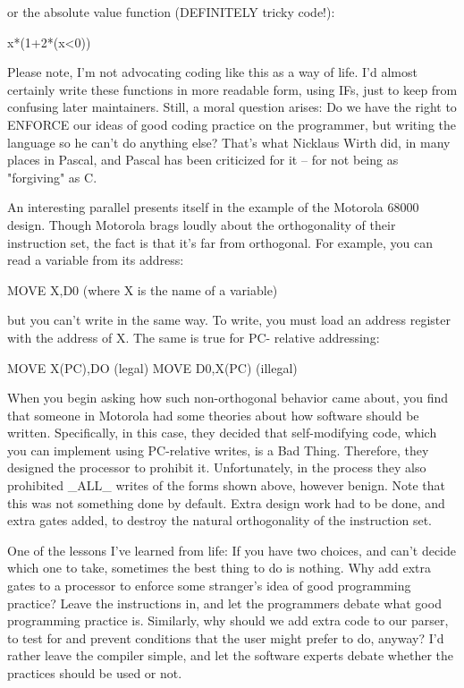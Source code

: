 \documentclass[float=false, crop=false]{standalone}
\begin{document}
or the absolute value function (DEFINITELY tricky code!):

	x*(1+2*(x<0))

Please note, I'm not advocating coding like this as a way of life.
I'd almost certainly write these functions in more readable form,
using IFs, just to keep from confusing later maintainers.  Still,
a moral question arises:  Do we have the right to ENFORCE our
ideas of good coding practice on the programmer, but writing the
language so he can't do anything else?  That's what Nicklaus Wirth
did, in many places in Pascal, and Pascal has been criticized for
it -- for not being as "forgiving" as C.

An interesting parallel presents itself in the example of the Motorola 68000
design. Though Motorola brags loudly about the orthogonality of their
instruction set, the fact is that it's far from orthogonal. For example, you can
read a variable from its address:

	MOVE X,D0 (where X is the name of a variable)

but you can't write in the same way. To write, you must load an address register
with the address of X. The same is true for PC- relative addressing:

	MOVE X(PC),DO	(legal)
	MOVE D0,X(PC)	(illegal)

When you begin asking how such non-orthogonal behavior came about, you find that
someone in Motorola had some theories about how software should be written.
Specifically, in this case, they decided that self-modifying code, which you can
implement using PC-relative writes, is a Bad Thing. Therefore, they designed the
processor to prohibit it. Unfortunately, in the process they also prohibited
_ALL_ writes of the forms shown above, however benign. Note that this was not
something done by default. Extra design work had to be done, and extra gates
added, to destroy the natural orthogonality of the instruction set.

One of the lessons I've learned from life: If you have two choices, and can't
decide which one to take, sometimes the best thing to do is nothing. Why add
extra gates to a processor to enforce some stranger's idea of good programming
practice? Leave the instructions in, and let the programmers debate what good
programming practice is. Similarly, why should we add extra code to our parser,
to test for and prevent conditions that the user might prefer to do, anyway? I'd
rather leave the compiler simple, and let the software experts debate whether
the practices should be used or not.
\end{document}
